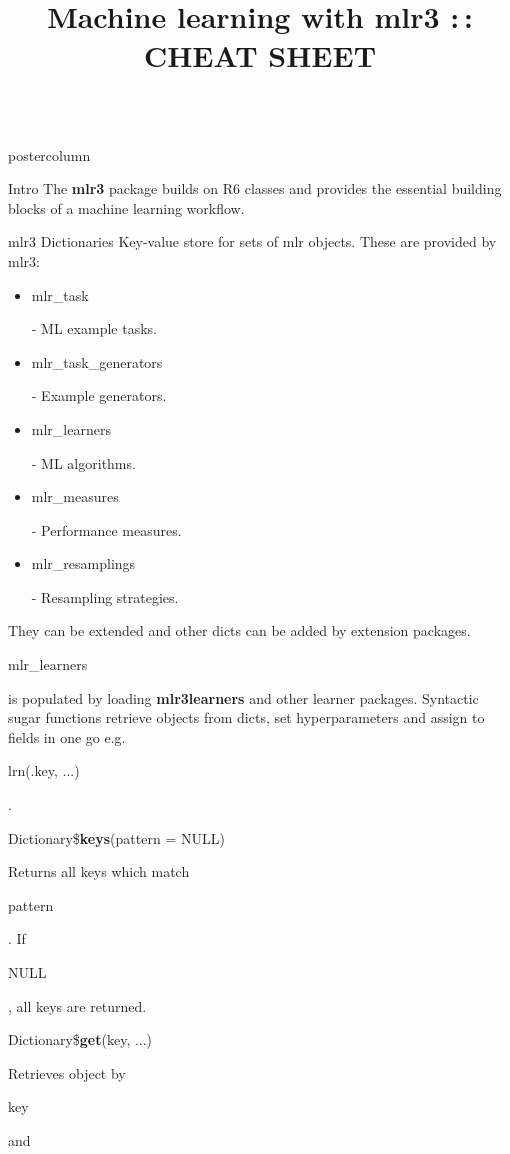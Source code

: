 \documentclass{beamer}
\title{Machine learning with mlr3 :\,: CHEAT SHEET} %
\newlength{\columnheight} %
\newcommand{\codeinline}[1]{\begin{codeboxinline}#1\end{codeboxinline}}
\begin{document}
\begin{frame}[fragile]{}
	\begin{columns}
		\begin{column}{.245\textwidth}
			\begin{beamercolorbox}[center]{postercolumn}
				\begin{minipage}{.98\textwidth}
					\parbox[t][\columnheight]{\textwidth}{
						\begin{myblock}{Intro}
							The \textbf{mlr3} package builds on R6 classes and provides the essential building
							blocks of a machine learning workflow.
						\end{myblock}
						\begin{myblock}{mlr3 Dictionaries}
                            Key-value store for sets of mlr objects. These are provided by mlr3: 
							\\
							\begin{itemize}
								\item \codeinline{mlr\_task} - ML example tasks.
								\item \codeinline{mlr\_task\_generators} - Example generators.
                                \item \codeinline{mlr\_learners} - ML algorithms. 
								\item \codeinline{mlr\_measures} - Performance measures.
								\item \codeinline{mlr\_resamplings} - Resampling strategies.
							\end{itemize}
							\vspace{0.5em}
                            They can be extended and other dicts can be added by extension packages.
                            \codeinline{mlr\_learners} is populated by loading \textbf{mlr3learners} and other learner packages. Syntactic sugar functions retrieve objects from dicts, set hyperparameters and assign to fields in one go e.g. \codeinline{lrn(.key, ...)}.
							\\
							\begin{codebox}
								Dictionary\$\textbf{keys}(pattern = NULL)
							\end{codebox}
							Returns all keys which match \codeinline{pattern}. 
							If \codeinline{NULL}, all keys are returned. 
							\\
							\begin{codebox}
								Dictionary\$\textbf{get}(key, ...)
							\end{codebox}
							Retrieves object by \codeinline{key} and 

\end{myblock}}
\end{minipage}
\end{beamercolorbox}
\end{column}
\end{columns}
\end{frame}
\end{document}
